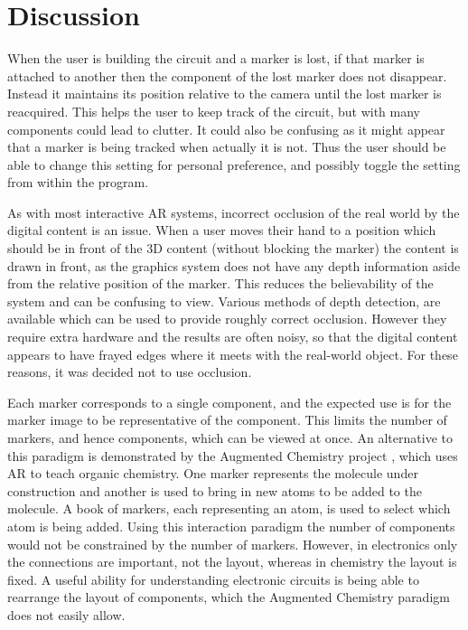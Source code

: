 \section{Discussion}

When the user is building the circuit and a marker is lost, if that marker is attached to another then the component of the lost marker does not disappear. Instead it maintains its position relative to the camera until the lost marker is reacquired. This helps the user to keep track of the circuit, but with many components could lead to clutter. It could also be confusing as it might appear that a marker is being tracked when actually it is not. Thus the user should be able to change this setting for personal preference, and possibly toggle the setting from within the program.

As with most interactive AR systems, incorrect occlusion of the real world by the digital content is an issue. When a user moves their hand to a position which should be in front of the 3D content (without blocking the marker) the content is drawn in front, as the graphics system does not have any depth information aside from the relative position of the marker. This reduces the believability of the system and can be confusing to view. Various methods of depth detection, are available which can be used to provide roughly correct occlusion. However they require extra hardware and the results are often noisy, so that the digital content appears to have frayed edges where it meets with the real-world object. For these reasons, it was decided not to use occlusion.

Each marker corresponds to a single component, and the expected use is for the marker image to be representative of the component. This limits the number of markers, and hence components, which can be viewed at once. An alternative to this paradigm is demonstrated by the Augmented Chemistry project \cite{fjeld07}, which uses AR to teach organic chemistry. One marker represents the molecule under construction and another is used to bring in new atoms to be added to the molecule. A book of markers, each representing an atom, is used to select which atom is being added. Using this interaction paradigm the number of components would not be constrained by the number of markers. However, in electronics only the connections are important, not the layout, whereas in chemistry the layout is fixed. A useful ability for understanding electronic circuits is being able to rearrange the layout of components, which the Augmented Chemistry paradigm does not easily allow.

